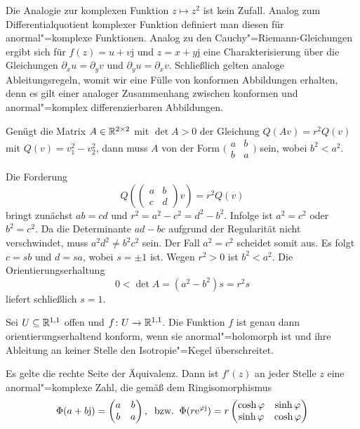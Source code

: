 Die Analogie zur komplexen Funktion $z\mapsto z^2$ ist kein Zufall.
Analog zum Differentialquotient komplexer Funktion definiert man diesen
für anormal"=komplexe Funktionen. Analog zu den
Cauchy"=Riemann-Gleichungen ergibt sich für $f(z)=u+v\mathrm{j}$ und
$z=x+y\mathrm{j}$ eine Charakterisierung über
die Gleichungen
$\partial_x u=\partial_y v$ und $\partial_y u = \partial_x v$.
Schließlich gelten analoge Ableitungsregeln, womit wir eine Fülle
von konformen Abbildungen erhalten, denn es gilt einer analoger
Zusammenhang zwischen konformen und anormal"=komplex differenzierbaren
Abbildungen.
\begin{lemma}\label{konforme-Matrix-2x2}
Genügt die Matrix $A\in\mathbb R^{2\times 2}$ mit $\det A>0$ der
Gleichung $Q(Av)=r^2 Q(v)$ mit $Q(v)=v_1^2-v_2^2$, dann muss $A$
von der Form $\big(\begin{smallmatrix}a & b\\ b & a\end{smallmatrix}\big)$
sein, wobei $b^2<a^2$.
\end{lemma}
 Die Forderung
\begin{equation}
Q(\begin{pmatrix}a & b\\ c & d\end{pmatrix}v) = r^2 Q(v)
\end{equation}
bringt zunächst $ab=cd$ und $r^2 = a^2-c^2 = d^2-b^2$. Infolge ist
$a^2=c^2$ oder $b^2=c^2$. Da die Determinante $ad-bc$ aufgrund der
Regularität nicht verschwindet, muss $a^2d^2\ne b^2c^2$ sein. Der Fall
$a^2=c^2$ scheidet somit aus. Es folgt $c=sb$ und $d=sa$, wobei
$s=\pm 1$ ist. Wegen $r^2>0$ ist $b^2<a^2$. Die
Orientierungserhaltung
\begin{equation}
0 < \det A = (a^2-b^2)s = r^2 s
\end{equation}
liefert schließlich $s=1$.\;\qedsymbol
\begin{corollary}
Sei $U\subseteq\mathbb R^{1,1}$ offen und
$f\colon U\to\mathbb R^{1,1}$. Die Funktion $f$ ist genau dann orientierungserhaltend
konform, wenn sie anormal"=holomorph ist und ihre Ableitung an keiner
Stelle den Isotropie"=Kegel überschreitet.
\end{corollary}
 Es gelte die rechte Seite der Äquivalenz. Dann ist
$f'(z)$ an jeder Stelle $z$ eine anormal"=komplexe Zahl,
die gemäß dem Ringisomorphismus
\begin{equation}
\Phi(a+b\mathrm j) = \begin{pmatrix} a & b\\ b & a\end{pmatrix},
\;\;\text{bzw.}\;\;
\Phi(r\mathrm e^{\varphi\mathrm j}) = r\begin{pmatrix}\cosh\varphi & \sinh\varphi\\
\sinh\varphi & \cosh\varphi\end{pmatrix}
\end{equation}
